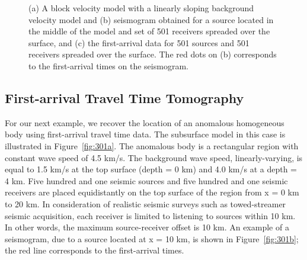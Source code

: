 \documentclass[manuscript,revised]{geophysics}
\begin{document}
{\begin{figure}
\caption{(a) A block velocity model with a linearly sloping background velocity model and (b) seismogram obtained for a source located in the middle of the model and set of 501 receivers spreaded over the surface, and (c) the first-arrival data for 501 sources and 501 receivers spreaded over the surface. The red dots on (b) corresponds to the first-arrival times on the seismogram.}
\label{fig:301}
\end{figure}
}

\subsection{First-arrival Travel Time Tomography}
For our next example, we recover the location of an anomalous homogeneous body using first-arrival travel time data.  The subsurface model in this case is illustrated in Figure~\ref{fig:301a}.  The anomalous body is a rectangular region with constant wave speed of 4.5 km/s.  The background wave speed, linearly-varying, is equal to 1.5 km/s at the top surface (depth = 0 km) and 4.0 km/s at a depth = 4 km.  Five hundred and one seismic sources and five hundred and one seismic receivers are placed equidistantly on the top surface of the region from x = 0 km to 20 km. In consideration of realistic seismic surveys such as towed-streamer seismic acquisition, each receiver is limited to listening to sources within 10 km.  In other words, the maximum source-receiver offset is 10 km.   An example of a seismogram, due to a source located at x = 10 km, is shown in Figure~\ref{fig:301b}; the red line corresponds to the first-arrival times.
\end{document}
